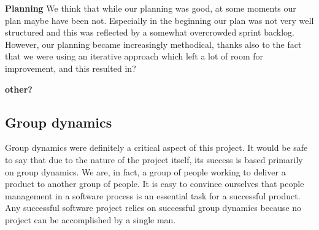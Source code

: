\textbf{Planning}\newline
We think that while our planning was good, at some moments our plan maybe have been not.
Especially in the beginning our plan was not very well structured and this was reflected
by a somewhat overcrowded sprint backlog. However, our planning became increasingly
methodical, thanks also to the fact that we were using an iterative approach which
left a lot of room for improvement, and this resulted in?

\textbf{other?}\newline

\subsection{Group dynamics}
\label{sec:group}

Group dynamics were definitely a critical aspect of this project.
It would be safe to say that due to the nature of the project itself, its success is based primarily on group dynamics.
We are, in fact, a group of people working to deliver a product to another group of people.
It is easy to convince ourselves that people management in a software process is an essential task for a successful product.
Any successful software project relies on successful group dynamics because no project can be
accomplished by a single man.%

